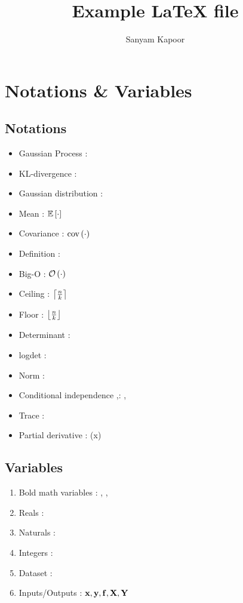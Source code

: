 \documentclass{article}
\title{Example \LaTeX{ }file}
\author{Sanyam Kapoor}
\begin{document}
\maketitle

\section{Notations \& Variables}

\subsection{Notations}

\begin{itemize}
\item Gaussian Process \vrb{\gp{\cdot,\cdot}}: \gp{\cdot,\cdot}
\item KL-divergence \vrb{\kl}: \kl
\item Gaussian distribution \vrb{\gaussian{}}: \gaussian{\cdot, \cdot}
\item Mean \vrb{\mean{\cdot}}: $\mathbb{E}\left[\cdot\right]$
\item Covariance \vrb{\cov{\cdor}}: $\mathrm{cov}\left(\cdot\right)$
\item Definition : 
\item Big-O \vrb{\bigo{\cdot}}:  $\mathcal{O}\left(\cdot\right)$
\item Ceiling : $\left\lceil \tfrac{n}{k} \right\rceil$
\item Floor : $\left\lfloor \tfrac{n}{k} \right\rfloor$
\item Determinant \vrb{\determ{}}: \determ{\cdot}
\item logdet \vrb{\logdet{}}: \logdet{\cdot}
\item Norm \vrb{\norm{}}: \norm{\cdot}
\item Conditional independence \vrb{\ci},\vrb{\nci}: \ci, \nci
\item Trace \vrb{\tr{}}: \tr{\cdot}
\item Partial derivative \vrb{\pd{}{}}: (x)
\end{itemize}

\subsection{Variables}
\begin{enumerate}%
\item Bold math variables \vrb{\mbf{}}: \mbf{\Sigma}, ,
\item Reals \vrb{\reals}: \reals
\item Naturals \vrb{\naturals}: \naturals
\item Integers \vrb{\ints}: \ints
\item Dataset \vrb{\dset}: \dset
\item Inputs/Outputs \vrb{\xvec,\yvec,\fvec,\Xvec,\Yvec}: ${\boldsymbol{\mathbf{x}}},{\boldsymbol{\mathbf{y}}},{\boldsymbol{\mathbf{f}}},{\boldsymbol{\mathbf{X}}},{\boldsymbol{\mathbf{Y}}}$
\end{enumerate}
\end{document}
